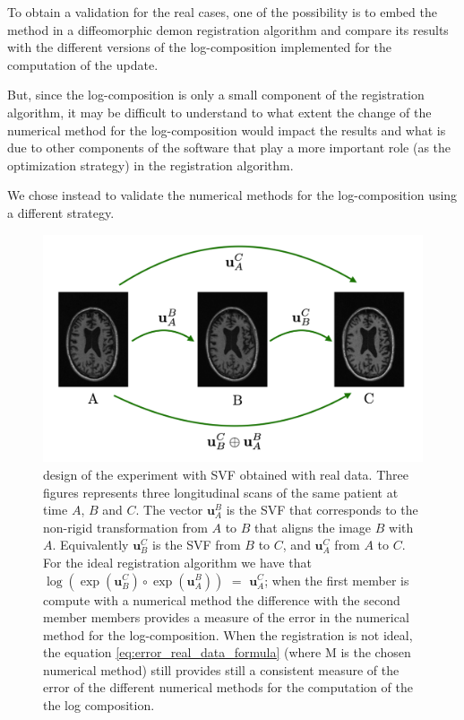 To obtain a validation for the real cases, one of the possibility is to embed the method in a diffeomorphic demon registration algorithm and compare its results with the different versions of the log-composition implemented for the computation of the update.

But, since the log-composition is only a small component of the registration algorithm, it may be difficult to understand to what extent the change of the numerical method for the log-composition would impact the results and what is due to other components of the software that play a more important role (as the optimization strategy) in the registration algorithm.

We chose instead to validate the numerical methods for the log-composition using a different strategy.

\begin{figure}[!ht]
	\centering
	\includegraphics[scale=0.25]{figures/three_brains_problem.pdf}
	\caption{design of the experiment with SVF obtained with real data. Three figures represents three  longitudinal scans of the same patient at time $A$, $B$ and $C$. The vector $\mathbf{u}_{A}^{B}$ is the SVF that corresponds to the non-rigid transformation from $A$ to $B$ that aligns the image $B$ with $A$. Equivalently $\mathbf{u}_{B}^{C}$ is the SVF from $B$ to $C$, and $\mathbf{u}_{A}^{C}$ from $A$ to $C$. For the ideal registration algorithm we have that $\log(\exp(\mathbf{u}_{B}^{C}) \circ \exp(\mathbf{u}_{A}^{B}))$ $=$ $\mathbf{u}_{A}^{C} $; when the first member is compute with a numerical method the difference with the second member members provides a measure of the error in the numerical method for the log-composition. When the registration is not ideal, the equation \ref{eq:error_real_data_formula} (where M is the chosen numerical method) still provides still a consistent measure of the error of the different numerical methods for the computation of the the log composition. }
	\label{fig:three_brains_problem}
\end{figure}

